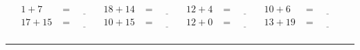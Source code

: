 \documentclass{article}
\begin{document}
\begin{sloppy}
\begin{align*}
    {1} + {7} &= \underline{\hspace{1cm}} & {18} + {14} &= \underline{\hspace{1cm}} & {12} + {4} &= \underline{\hspace{1cm}} & {10} + {6} &= \underline{\hspace{1cm}} \\
    {17} + {15} &= \underline{\hspace{1cm}} & {10} + {15} &= \underline{\hspace{1cm}} & {12} + {0} &= \underline{\hspace{1cm}} & {13} + {19} &= \underline{\hspace{1cm}} \\
\end{align*}
\hrule
\end{sloppy}
\end{document}
